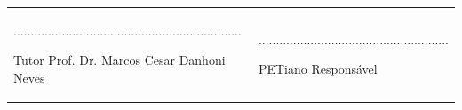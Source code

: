 \documentclass[a4paper,12pt]{report}
\begin{document}
 
\vfill 

\begin{center}
	\begin{tabular}{m{7cm}m{7cm}}
		\begin{flushleft}
		\begin{center} 
			..................................................................
						
			 Tutor Prof. Dr. Marcos Cesar Danhoni Neves		
		\end{center}
		\end{flushleft}
		&
		\begin{flushright}
		\begin{center}
			.......................................................
						
			 PETiano Responsável
		\end{center}		
		\end{flushright}
	\end{tabular}
\end{center}
\end{document}
